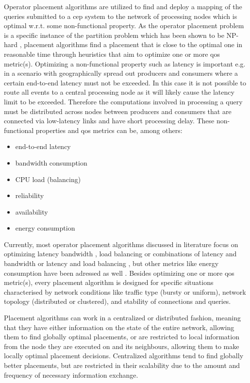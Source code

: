 Operator placement algorithms are utilized to find and deploy a mapping of the queries submitted to a \gls{cep} system to the network of processing nodes which is optimal w.r.t. some non-functional property.
As the operator placement problem is a specific instance of the partition problem which has been shown to be NP-hard \cite{Cardellini2016}, placement algorithms find a placement that is close to the optimal one in reasonable time through heuristics that aim to optimize one or more \gls{qos} metric(s).
Optimizing a non-functional property such as latency is important e.g. in a scenario with geographically spread out producers and consumers where a certain end-to-end latency must not be exceeded. In this case it is not possible to route all events to a central processing node as it will likely cause the latency limit to be exceeded. Therefore the computations involved in processing a query must be distributed across nodes between producers and consumers that are connected via low-latency links and have short processing delay.
These non-functional properties and \gls{qos} metrics can be, among others: 
\begin{itemize}
\item end-to-end latency 
\item bandwidth consumption
\item CPU load (balancing)
\item reliability
\item availability
\item energy consumption
\end{itemize}
Currently, most operator placement algorithms discussed in literature focus on optimizing latency \cite{Pandit2004} bandwidth \cite{Ahmad2004} \cite{Schilling2010}, load balancing \cite{Xing2005} or combinations of latency and bandwidth  \cite{Pietzuch2006} \cite{Rizou2010} or latency and load balancing \cite{Heinze2013}, but other metrics like energy consumption have been adressed as well \cite{Bonfils2004}. 
Besides optimizing one or more \gls{qos} metric(s), every placement algorithm is designed for specific situations characterised by network conditions like traffic type (bursty or uniform), network topology (distributed or clustered), and stability of connections and queries. 

Placement algorithms can work in a centralized or distributed fashion, meaning that they have either information on the state of the entire network, allowing them to find globally optimal placements, or are restricted to local information from the node they are executed on and its neighbours, allowing them to make locally optimal placement decisions. Centralized algorithms tend to find globally better placements, but are restricted in their scalability due to the amount and frequency of necessary information exchange. 

